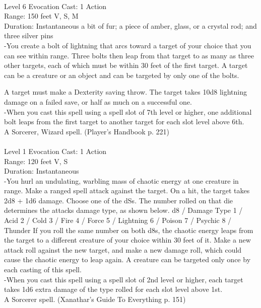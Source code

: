 \documentclass[10pt,twocolumn]{report}
\begin{document}
 \\
Level 6 \quad Evocation \quad Cast: 1 Action\\
Range: 150 feet \quad V, S, M \\
Duration: Instantaneous \quad a bit of fur; a piece of amber, glass, or a crystal rod; and three silver pins\\
-You create a bolt of lightning that arcs toward a target of your choice that you can see within range. Three bolts then leap from that target to as many as three other targets, each of which must be within 30 feet of the first target. A target can be a creature or an object and can be targeted by only one of the bolts. 

A target must make a Dexterity saving throw. The target takes 10d8 lightning damage on a failed save, or half as much on a successful one.\\
-When you cast this spell using a spell slot of 7th level or higher, one additional bolt leaps from the first target to another target for each slot level above 6th.\\
A Sorcerer, Wizard spell. (Player's Handbook p. 221) \\


 \\
Level 1 \quad Evocation \quad Cast: 1 Action\\
Range: 120 feet \quad V, S\\
Duration: Instantaneous \quad \\
-You hurl an undulating, warbling mass of chaotic energy at one creature in range. Make a ranged spell attack against the target. On a hit, the target takes 2d8 + 1d6 damage. Choose one of the dSs. The number rolled on that die determines the attacks damage type, as shown below.
d8 / Damage Type
1 / Acid
2 / Cold
3 / Fire
4 / Force
5 / Lightning
6 / Poison
7 / Psychic
8 / Thunder
If you roll the same number on both d8s, the chaotic energy leaps from the target to a different creature of your choice within 30 feet of it. Make a new attack roll against the new target, and make a new damage roll, which could cause the chaotic energy to leap again. A creature can be targeted only once by each casting of this spell.\\
-When you cast this spell using a spell slot of 2nd level or higher, each target takes 1d6 extra damage of the type rolled for each slot level above 1st.\\
A Sorcerer spell. (Xanathar's Guide To Everything p. 151) \\
\end{document}
